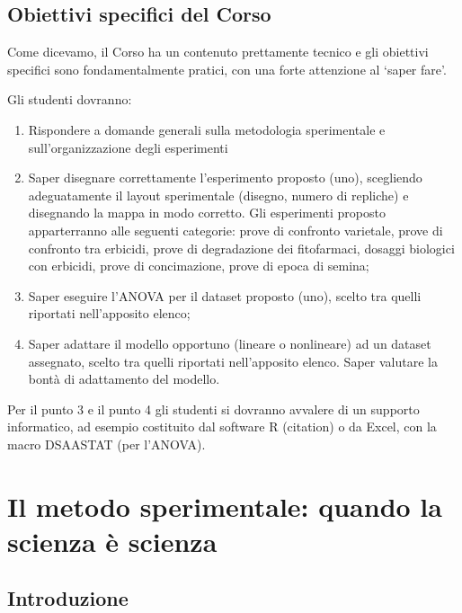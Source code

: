 \documentclass[a4paper,12pt,oneside]{book}
\providecommand{\tightlist}{%
  \setlength{\itemsep}{0pt}\setlength{\parskip}{0pt}}
\begin{document}
\section*{Obiettivi specifici del
Corso}\label{obiettivi-specifici-del-corso}

Come dicevamo, il Corso ha un contenuto prettamente tecnico e gli
obiettivi specifici sono fondamentalmente pratici, con una forte
attenzione al `saper fare'.

Gli studenti dovranno:

\begin{enumerate}
\def\labelenumi{\arabic{enumi}.}
\tightlist
\item
  Rispondere a domande generali sulla metodologia sperimentale e
  sull'organizzazione degli esperimenti
\item
  Saper disegnare correttamente l'esperimento proposto (uno), scegliendo
  adeguatamente il layout sperimentale (disegno, numero di repliche) e
  disegnando la mappa in modo corretto. Gli esperimenti proposto
  apparterranno alle seguenti categorie: prove di confronto varietale,
  prove di confronto tra erbicidi, prove di degradazione dei
  fitofarmaci, dosaggi biologici con erbicidi, prove di concimazione,
  prove di epoca di semina;
\item
  Saper eseguire l'ANOVA per il dataset proposto (uno), scelto tra
  quelli riportati nell'apposito elenco;
\item
  Saper adattare il modello opportuno (lineare o nonlineare) ad un
  dataset assegnato, scelto tra quelli riportati nell'apposito elenco.
  Saper valutare la bontà di adattamento del modello.
\end{enumerate}

Per il punto 3 e il punto 4 gli studenti si dovranno avvalere di un
supporto informatico, ad esempio costituito dal software R (citation) o
da Excel, con la macro DSAASTAT (per l'ANOVA).

\chapter{Il metodo sperimentale: quando la scienza è
scienza}\label{il-metodo-sperimentale-quando-la-scienza-e-scienza}

\section{Introduzione}\label{introduzione-1}
\end{document}
